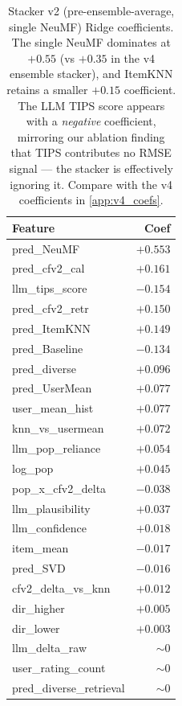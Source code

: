 \documentclass[11pt,a4paper]{article}
\newcommand{\best}[1]{\textcolor{goodgreen}{\textbf{#1}}}
\newcommand{\worst}[1]{\textcolor{badred}{#1}}
\begin{document}
\begin{table}[H]
\centering
\small
\begin{tabular}{lr}
\toprule
Feature & Coef \\ \midrule
pred\_NeuMF                   & \best{$+0.553$} \\
pred\_cfv2\_cal               & $+0.161$ \\
llm\_tips\_score              & $-0.154$ \\
pred\_cfv2\_retr              & $+0.150$ \\
pred\_ItemKNN                 & $+0.149$ \\
pred\_Baseline                & \worst{$-0.134$} \\
pred\_diverse                 & $+0.096$ \\
pred\_UserMean                & $+0.077$ \\
user\_mean\_hist              & $+0.077$ \\
knn\_vs\_usermean             & $+0.072$ \\
llm\_pop\_reliance            & $+0.054$ \\
log\_pop                      & $+0.045$ \\
pop\_x\_cfv2\_delta           & $-0.038$ \\
llm\_plausibility             & $+0.037$ \\
llm\_confidence               & $+0.018$ \\
item\_mean                    & $-0.017$ \\
pred\_SVD                     & $-0.016$ \\
cfv2\_delta\_vs\_knn          & $+0.012$ \\
dir\_higher                   & $+0.005$ \\
dir\_lower                    & $+0.003$ \\
llm\_delta\_raw               & $\sim 0$ \\
user\_rating\_count           & $\sim 0$ \\
pred\_diverse\_retrieval      & $\sim 0$ \\
\bottomrule
\end{tabular}
\caption{Stacker v2 (pre-ensemble-average, single NeuMF) Ridge
coefficients. The single NeuMF dominates at $+0.55$ (vs $+0.35$ in the v4
ensemble stacker), and ItemKNN retains a smaller $+0.15$ coefficient. The
LLM TIPS score appears with a \emph{negative} coefficient, mirroring our
ablation finding that TIPS contributes no RMSE signal --- the stacker is
effectively ignoring it. Compare with the v4 coefficients in
\cref{app:v4_coefs}.}
\label{tab:v2_coefs}
\end{table}
\end{document}
